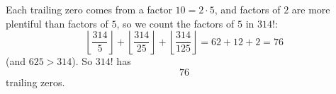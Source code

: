 Each trailing zero comes from a factor $10=2\cdot5$, and factors of $2$ are more plentiful than factors of $5$, so we count the factors of $5$ in $314!$:
\[
\left\lfloor\dfrac{314}{5}\right\rfloor+\left\lfloor\dfrac{314}{25}\right\rfloor+\left\lfloor\dfrac{314}{125}\right\rfloor=62+12+2=76
\]
(and $625>314$). So $314!$ has
\[\boxed{76}\]
trailing zeros.
